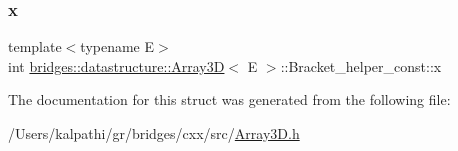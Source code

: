 \subsubsection{\texorpdfstring{x}{x}}
{\footnotesize\ttfamily template$<$typename E$>$ \\
int \mbox{\hyperlink{classbridges_1_1datastructure_1_1_array3_d}{bridges\+::datastructure\+::\+Array3D}}$<$ E $>$\+::Bracket\+\_\+helper\+\_\+const\+::x}



The documentation for this struct was generated from the following file\+:\begin{DoxyCompactItemize}
\item 
/\+Users/kalpathi/gr/bridges/cxx/src/\mbox{\hyperlink{_array3_d_8h}{Array3\+D.\+h}}\end{DoxyCompactItemize}
